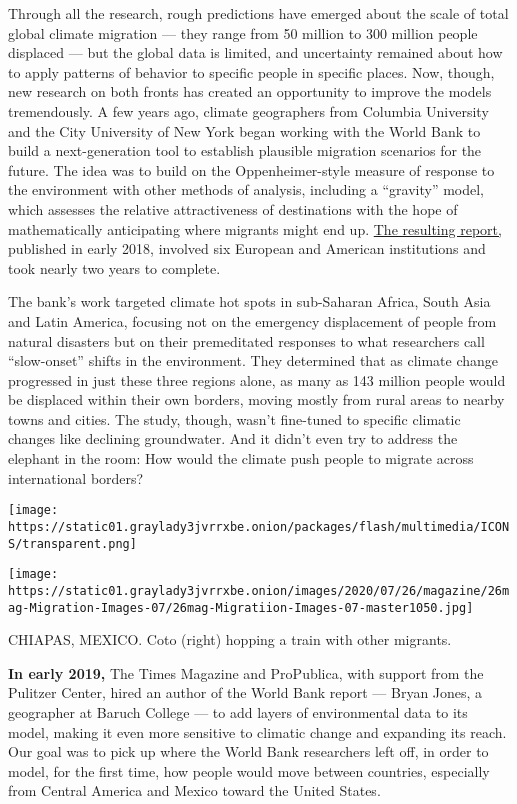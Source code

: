 Through all the research, rough predictions have emerged about the scale
of total global climate migration --- they range from 50 million to 300
million people displaced --- but the global data is limited, and
uncertainty remained about how to apply patterns of behavior to specific
people in specific places. Now, though, new research on both fronts has
created an opportunity to improve the models tremendously. A few years
ago, climate geographers from Columbia University and the City
University of New York began working with the World Bank to build a
next-generation tool to establish plausible migration scenarios for the
future. The idea was to build on the Oppenheimer-style measure of
response to the environment with other methods of analysis, including a
``gravity'' model, which assesses the relative attractiveness of
destinations with the hope of mathematically anticipating where migrants
might end up.
\href{https://www.worldbank.org/en/news/infographic/2018/03/19/groundswell---preparing-for-internal-climate-migration}{The
resulting report,} published in early 2018, involved six European and
American institutions and took nearly two years to complete.

The bank's work targeted climate hot spots in sub-Saharan Africa, South
Asia and Latin America, focusing not on the emergency displacement of
people from natural disasters but on their premeditated responses to
what researchers call ``slow-onset'' shifts in the environment. They
determined that as climate change progressed in just these three regions
alone, as many as 143 million people would be displaced within their own
borders, moving mostly from rural areas to nearby towns and cities. The
study, though, wasn't fine-tuned to specific climatic changes like
declining groundwater. And it didn't even try to address the elephant in
the room: How would the climate push people to migrate across
international borders?

\texttt{[image: https://static01.graylady3jvrrxbe.onion/packages/flash/multimedia/ICONS/transparent.png]}

\texttt{[image: https://static01.graylady3jvrrxbe.onion/images/2020/07/26/magazine/26mag-Migration-Images-07/26mag-Migratiion-Images-07-master1050.jpg]}

CHIAPAS, MEXICO. Coto (right) hopping a train with other migrants.

\textbf{In early 2019,} The Times Magazine and ProPublica, with support
from the Pulitzer Center, hired an author of the World Bank report ---
Bryan Jones, a geographer at Baruch College --- to add layers of
environmental data to its model, making it even more sensitive to
climatic change and expanding its reach. Our goal was to pick up where
the World Bank researchers left off, in order to model, for the first
time, how people would move between countries, especially from Central
America and Mexico toward the United States.

